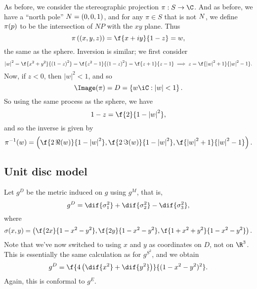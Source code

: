 As before, we consider the stereographic projection $\pi:S\to\C$. And as before, we have a ``north pole'' $N=(0,0,1)$, and for any $\pi\in S$ that is not $N$, we define $\pi(p)$ to be the intersection of $NP$ with the $xy$ plane. Thus
\begin{equation*}
	\pi\left( (x,y,z) \right) = \f{x+iy}{1-z} = w,
\end{equation*}
the same as the sphere. Inversion is similar; we first consider
\begin{equation*}
	\left\vert w \right\vert^2
	= \f{x^2+y^2}{\left( 1-z \right)^2}
	= \f{z^2-1}{\left( 1-z \right)^2}
	= \f{z+1}{z-1}
	\implies
	z = \f{\left\vert w \right\vert^2+1}{\left\vert w \right\vert^2-1}.
\end{equation*}
Now, if $z<0$, then $\left\vert w \right\vert^2<1$, and so
\begin{equation*}
	\Image(\pi) = D = \left\{w\iC: \left\vert w \right\vert<1\right\}.
\end{equation*}
So using the same process as the sphere, we have
\begin{equation*}
	1-z = \f{2}{1-\left\vert w \right\vert^2},
\end{equation*}
and so the inverse is given by
\begin{equation*}
	\pi^{-1}(w) = \left( \f{2\,\Re(w)}{1-\left\vert w \right\vert^2}, \f{2\,\Im(w)}{1-\left\vert w \right\vert^2}, \f{\left\vert w \right\vert^2+1}{\left\vert w \right\vert^2-1} \right).
\end{equation*}


\subsection{Unit disc model} %
\label{sub:unit_disc_model}

Let $g^D$ be the metric induced on $g$ using $g^M$, that is,
\begin{equation*}
	g^D = \dif{\sigma_1^2} + \dif{\sigma_2^2} - \dif{\sigma_3^2},
\end{equation*}
where
\begin{equation*}
	\sigma(x,y) = \left( \f{2x}{1-x^2-y^2}, \f{2y}{1-x^2-y^2}, \f{1+x^2+y^2}{1-x^2-y^2} \right).
\end{equation*}
Note that we've now switched to using $x$ and $y$ as coordinates on $D$, not on $\R^3$. This is essentially the same calculation as for $g^{S^2}$, and we obtain
\begin{equation*}
	g^D = \f{4\left( \dif{x^2} + \dif{y^2} \right)}{(1-x^2-y^2)^2}.
\end{equation*}
Again, this is conformal to $g^E$.

